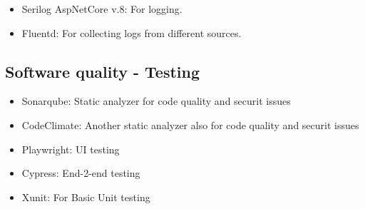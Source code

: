 \begin{itemize}
    \item Serilog AspNetCore v.8: For logging.
    \item Fluentd: For collecting logs from different sources. 
\end{itemize}


\subsection*{Software quality - Testing}

\begin{itemize}
    \item Sonarqube: Static analyzer for code quality and securit issues
    \item CodeClimate: Another static analyzer also for code quality and securit issues
    \item Playwright: UI testing 
    \item Cypress: End-2-end testing
    \item Xunit: For Basic Unit testing
\end{itemize}

